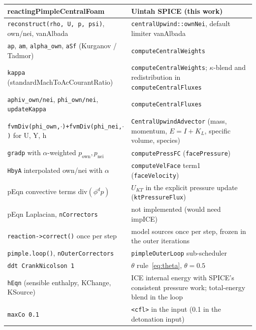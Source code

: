 \documentclass[11pt]{article}
\newcommand{\code}[1]{\texttt{\small #1}}
\newcommand{\own}{\mathrm{own}}
\newcommand{\nei}{\mathrm{nei}}
\begin{document}
\begin{center}
\small
\renewcommand{\arraystretch}{1.25}
\begin{tabularx}{\linewidth}{@{}>{\raggedright\arraybackslash}X >{\raggedright\arraybackslash}X@{}}
\toprule
\textbf{reactingPimpleCentralFoam} & \textbf{Uintah SPICE (this work)} \\
\midrule
\code{reconstruct(rho, U, p, psi)}, own/nei, vanAlbada & \code{centralUpwind::ownNei}, default limiter vanAlbada \\
\code{ap}, \code{am}, \code{alpha\_own}, \code{aSf} (Kurganov / Tadmor) & \code{computeCentralWeights} \\
\code{kappa} (standardMachToAcCourantRatio) & \code{computeCentralWeights}; $\kappa$-blend and redistribution in \code{computeCentralFluxes} \\
\code{aphiv\_own/nei}, \code{phi\_own/nei}, \code{updateKappa} & \code{computeCentralFluxes} \\
\code{fvmDiv(phi\_own,$\cdot$)+fvmDiv(phi\_nei,$\cdot$)} for U, Y, h & \code{CentralUpwindAdvector} (mass, momentum, $E=I+K_L$, specific volume, species) \\
\code{gradp} with $\alpha$-weighted $p_\own,p_\nei$ & \code{computePressFC} (\code{facePressure}) \\
\code{HbyA} interpolated own/nei with $\alpha$ & \code{computeVelFace} term1 (\code{faceVelocity}) \\
pEqn convective terms $\mathrm{div}(\phi^d p)$ & $U_{KT}$ in the explicit pressure update (\code{ktPressureFlux}) \\
pEqn Laplacian, \code{nCorrectors} & not implemented (would need impICE) \\
\code{reaction->correct()} once per step & model sources once per step, frozen in the outer iterations \\
\code{pimple.loop()}, \code{nOuterCorrectors} & \code{pimpleOuterLoop} sub-scheduler \\
\code{ddt CrankNicolson 1} & $\theta$ rule~\eqref{eq:theta}, $\theta=0.5$ \\
\code{hEqn} (sensible enthalpy, KChange, KSource) & ICE internal energy with SPICE's consistent pressure work; total-energy blend in the loop \\
\code{maxCo 0.1} & \code{<cfl>} in the input (0.1 in the detonation input) \\
\bottomrule
\end{tabularx}
\end{center}
\end{document}
